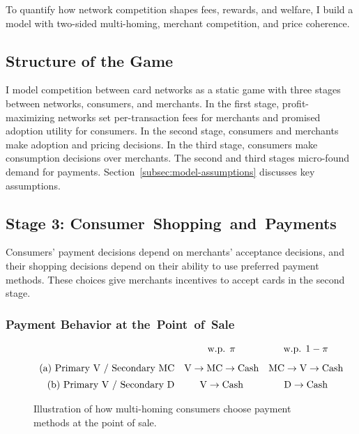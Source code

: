 \documentclass[main.tex]{subfiles}
\begin{document}
To quantify how network competition shapes fees, rewards, and welfare, I build a model with two-sided multi-homing, merchant competition, and price coherence.

\subsection{Structure of the Game}

I model competition between card networks as a static game with three stages between networks, consumers, and merchants.
In the first stage, profit-maximizing networks set per-transaction fees for merchants and promised adoption utility for consumers.
In the second stage, consumers and merchants make adoption and pricing decisions.
In the third stage, consumers make consumption decisions over merchants.
The second and third stages micro-found demand for payments.
Section~\ref{subsec:model-assumptions} discusses key assumptions.

\subsection{Stage 3: Consumer~Shopping~and~Payments}

Consumers' payment decisions depend on merchants' acceptance decisions, and their shopping decisions depend on their ability to use preferred payment methods.
These choices give merchants incentives to accept cards in the second stage.

\subsubsection{Payment Behavior at the~Point~of~Sale}
\label{subsubsec:payment-tree}

\newcommand{\smallcheck}{\scalebox{0.7}{\checkmark}}
\newcommand{\smallxmark}{\scalebox{0.7}{\xmark}}

\begin{figure}
\caption{Illustration of how multi-homing consumers choose payment methods at the point of sale.}
\label{fig:payment-pos-illustration}
\[
\begin{array}{r@{\quad}cc}
 & \text{w.p. } \pi & \text{w.p. } 1-\pi \\[0.8em]
\text{(a) Primary V / Secondary MC} & \text{V} \to \text{MC} \to \text{Cash} & \text{MC} \to \text{V} \to \text{Cash} \\[0.5em]
\text{(b) Primary V / Secondary D} & \text{V} \to \text{Cash} & \text{D} \to \text{Cash}
\end{array}
\]
\end{figure}
\end{document}
